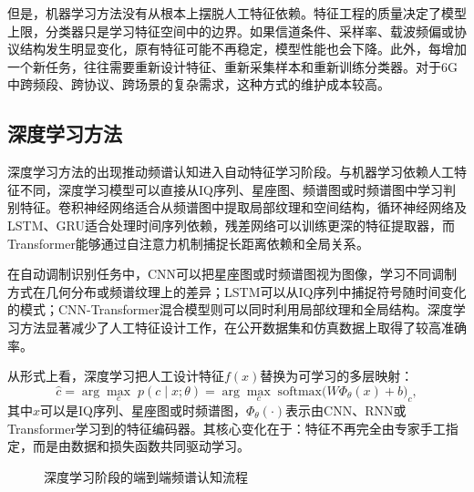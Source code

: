 \documentclass[UTF8,fontset=windows,zihao=-4]{ctexart}
\begin{document}
但是，机器学习方法没有从根本上摆脱人工特征依赖。特征工程的质量决定了模型上限，分类器只是学习特征空间中的边界。如果信道条件、采样率、载波频偏或协议结构发生明显变化，原有特征可能不再稳定，模型性能也会下降。此外，每增加一个新任务，往往需要重新设计特征、重新采集样本和重新训练分类器。对于6G中跨频段、跨协议、跨场景的复杂需求，这种方式的维护成本较高。

\subsection{深度学习方法}
深度学习方法的出现推动频谱认知进入自动特征学习阶段\cite{oshea,rajendran}。与机器学习依赖人工特征不同，深度学习模型可以直接从IQ序列、星座图、频谱图或时频谱图中学习判别特征。卷积神经网络适合从频谱图中提取局部纹理和空间结构，循环神经网络及LSTM、GRU适合处理时间序列依赖，残差网络可以训练更深的特征提取器，而Transformer能够通过自注意力机制捕捉长距离依赖和全局关系\cite{vaswani}。

在自动调制识别任务中，CNN可以把星座图或时频谱图视为图像，学习不同调制方式在几何分布或频谱纹理上的差异；LSTM可以从IQ序列中捕捉符号随时间变化的模式；CNN-Transformer混合模型则可以同时利用局部纹理和全局结构。深度学习方法显著减少了人工特征设计工作，在公开数据集和仿真数据上取得了较高准确率。

从形式上看，深度学习把人工设计特征$f(x)$替换为可学习的多层映射：
\begin{equation}
\hat{c}=\arg\max_c\;p(c\mid x;\theta)=\arg\max_c\;\mathrm{softmax}\bigl(W\Phi_\theta(x)+b\bigr)_c,
\end{equation}
其中$x$可以是IQ序列、星座图或时频谱图，$\Phi_\theta(\cdot)$表示由CNN、RNN或Transformer学习到的特征编码器。其核心变化在于：特征不再完全由专家手工指定，而是由数据和损失函数共同驱动学习。

\begin{figure}[H]
\centering
{}
\caption{深度学习阶段的端到端频谱认知流程}
\label{fig:dl-pipeline}
\end{figure}
\end{document}
